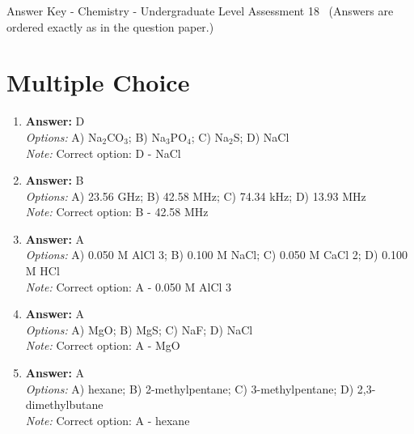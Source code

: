 \documentclass[12pt]{article}
\begin{document}
\begin{center}
Answer Key - Chemistry - Undergraduate Level Assessment 18 \
\small (Answers are ordered exactly as in the question paper.)
\end{center}

\section*{Multiple Choice}
\begin{enumerate}[label=\arabic*.]
\item \textbf{Answer:} D
\\ \textit{Options:} A) Na$_{2}$CO$_{3}$; B) Na$_{3}$PO$_{4}$; C) Na$_{2}$S; D) NaCl
\\ \textit{Note:} Correct option: D - NaCl
\item \textbf{Answer:} B
\\ \textit{Options:} A) 23.56 GHz; B) 42.58 MHz; C) 74.34 kHz; D) 13.93 MHz
\\ \textit{Note:} Correct option: B - 42.58 MHz
\item \textbf{Answer:} A
\\ \textit{Options:} A) 0.050 M AlCl 3; B) 0.100 M NaCl; C) 0.050 M CaCl 2; D) 0.100 M HCl
\\ \textit{Note:} Correct option: A - 0.050 M AlCl 3
\item \textbf{Answer:} A
\\ \textit{Options:} A) MgO; B) MgS; C) NaF; D) NaCl
\\ \textit{Note:} Correct option: A - MgO
\item \textbf{Answer:} A
\\ \textit{Options:} A) hexane; B) 2-methylpentane; C) 3-methylpentane; D) 2,3-dimethylbutane
\\ \textit{Note:} Correct option: A - hexane
\end{enumerate}
\end{document}
